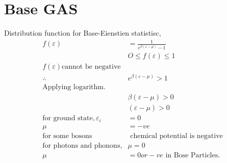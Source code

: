 \section{Base GAS}
Distribution function for Base-Eienstien statistisc,
\begin{align*}
f(\varepsilon)&=\frac{1}{e^{\beta(\varepsilon-\mu)}-1}\\
&O\leq f(\varepsilon)\leq1\\
f(\varepsilon)\text{cannot be negative}\\
\therefore &e^{\beta(\varepsilon-\mu)}>1\\
\text{Applying logarithm.}\\
&\beta(\varepsilon-\mu)>0\\
&(\varepsilon-\mu)>0\\
\text{for ground state},\varepsilon_{i}&=0\\
\mu&=-ve\\
\text{for some bosons}&\text{ chemical potential is negative} \\
\text{for photons and phonons,}&\mu=0\\
\mu&=0 or -ve\text{ in Bose Particles.}
\end{align*}

